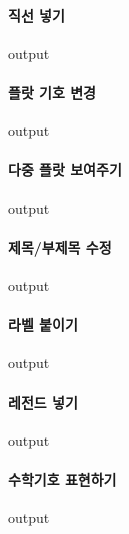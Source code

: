 \documentclass{report}
\begin{document}
\paragraph{직선 넣기}
\begin{Schunk}
\begin{Soutput}
output
\end{Soutput}
\end{Schunk}
\paragraph{플랏 기호 변경}
\begin{Schunk}
\begin{Soutput}
output
\end{Soutput}
\end{Schunk}
\paragraph{다중 플랏 보여주기}
\begin{Schunk}
\begin{Soutput}
output
\end{Soutput}
\end{Schunk}
\paragraph{제목/부제목 수정}
\begin{Schunk}
\begin{Soutput}
output
\end{Soutput}
\end{Schunk}
\paragraph{라벨 붙이기}
\begin{Schunk}
\begin{Soutput}
output
\end{Soutput}
\end{Schunk}
\paragraph{레전드 넣기}
\begin{Schunk}
\begin{Soutput}
output
\end{Soutput}
\end{Schunk}
\paragraph{수학기호 표현하기}
\begin{Schunk}
\begin{Soutput}
output
\end{Soutput}
\end{Schunk}
\end{document}

